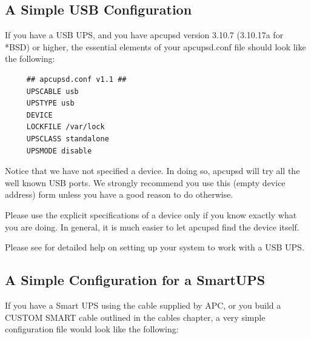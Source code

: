 \label{index-Configuration_002c-Examples-63}
\label{index-Examples_002c-Configuration-64}

\label{A-Simple-USB-Configuration}

\subsection*{A Simple USB Configuration}

\label{index-Configuration_002c-USB-65}
\label{index-USB_002c-configuration-66}
\label{index-Example_002c-USB-conf-67}
If you have a USB UPS, and you have apcupsd version 3.10.7 (3.10.17a for *BSD)
or higher, the essential elements of your apcupsd.conf file should look like 
the following: 

\footnotesize
\begin{verbatim}
     ## apcupsd.conf v1.1 ##
     UPSCABLE usb
     UPSTYPE usb
     DEVICE
     LOCKFILE /var/lock
     UPSCLASS standalone
     UPSMODE disable
\end{verbatim}
\normalsize

Notice that we have not specified a device. In doing so, apcupsd will try all
the well known USB ports. We strongly recommend you use this (empty device
address) form unless you have a good reason to do otherwise.  

Please use the explicit specifications of a device only if you know exactly
what you are doing. In general, it is much easier to let apcupsd find the
device itself.

Please see  for detailed help
on setting up your system to work with a USB UPS.

\label{A-Simple-Configuration-for-a-SmartUPS}

\subsection*{A Simple Configuration for a SmartUPS}

\label{index-Configuration_002c-SmartUPS-68}
\label{index-SmartUPS-configuration-69}
\label{index-Example_002c-SmartUPS-conf-70}
If you have a Smart UPS using the cable supplied by APC, or you build a CUSTOM
SMART cable outlined in the cables chapter, a very simple configuration file
would look like the following: 

